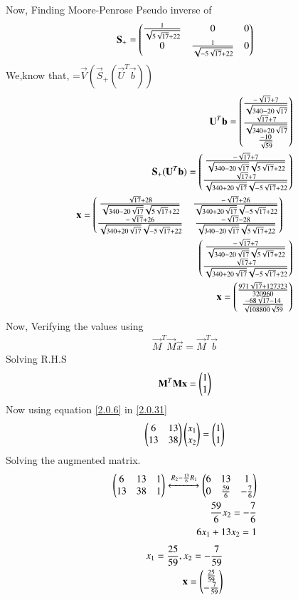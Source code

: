 \documentclass[journal,12pt,twocolumn]{IEEEtran}
\begin{document}
Now, Finding Moore-Penrose Pseudo inverse of 
\begin{align}
\mathbf{S}_+=\begin{pmatrix}\frac{1}{\sqrt{5\sqrt{17}+22}}&0&0\\0&\frac{1}{\sqrt{-5\sqrt{17}+22}}&0\end{pmatrix}
\end{align}
We,know that,
=$\vec{V}(\vec{S}_+(\vec{U}^T\vec{b}))$
\begin{align}
\vec{U}^T\vec{b}=\myvec{\frac{-\sqrt{17}+7}{\sqrt{340-20\sqrt{17}}}\\\frac{\sqrt{17}+7}{\sqrt{340+20\sqrt{17}}}\\\frac{-10}{\sqrt{59}}}\\
\vec{S}_+(\vec{U}^T\vec{b})=\myvec{\frac{-\sqrt{17}+7}{\sqrt{340-20\sqrt{17}}\sqrt{5\sqrt{17}+22}}\\\frac{\sqrt{17}+7}{\sqrt{340+20\sqrt{17}}\sqrt{-5\sqrt{17}+22}}}\\
\begin{multlined}
\vec{x}=\myvec{\frac{\sqrt{17}+28}{\sqrt{340-20\sqrt{17}}\sqrt{5\sqrt{17}+22}}&\frac{-\sqrt{17}+26}{\sqrt{340+20\sqrt{17}}\sqrt{-5\sqrt{17}+22}}\\\frac{-\sqrt{17}+26}{\sqrt{340+20\sqrt{17}}\sqrt{-5\sqrt{17}+22}}&\frac{-\sqrt{17}-28}{\sqrt{340-20\sqrt{17}}\sqrt{5\sqrt{17}+22}}}\\
\myvec{\frac{-\sqrt{17}+7}{\sqrt{340-20\sqrt{17}}\sqrt{5\sqrt{17}+22}}\\\frac{\sqrt{17}+7}{\sqrt{340+20\sqrt{17}}\sqrt{-5\sqrt{17}+22}}}
\end{multlined}\\
\vec{x}=\myvec{\frac{971\sqrt{17}+127323}{320960}\\\frac{-68\sqrt{17}-14}{\sqrt{108800}\sqrt{59}}}
\end{align}
Now, Verifying the values using
\begin{align}
\vec{M}^T\vec{M}\vec{x} = \vec{M}^T\vec{b}
\end{align}
Solving R.H.S
\begin{align}
\mathbf{M}^T\mathbf{M}\mathbf{x} =\begin{pmatrix}1\\1\end{pmatrix}\label{2.0.31}
\end{align}
Now using equation \eqref{2.0.6} in \eqref{2.0.31}
\begin{align}
\begin{pmatrix}6&13\\13&38\end{pmatrix}\begin{pmatrix}x_1\\x_2\end{pmatrix}=\begin{pmatrix}1\\1\end{pmatrix}
\end{align}
Solving the augmented matrix.
\begin{align}
\begin{pmatrix}6&13&1\\13&38&1\end{pmatrix} \xleftrightarrow{R_2-{\frac{13}{6}}R_1}\begin{pmatrix}6&13&1\\0&\frac{59}{6}&-\frac{7}{6}\end{pmatrix}\\
\frac{59}{6}x_2=-\frac{7}{6}\\
6x_1+13x_2=1
\end{align}
\begin{align}
x_1= \frac{25}{59},
x_2=-\frac{7}{59}\\
\mathbf{x}=\begin{pmatrix}\frac{25}{59}\\-\frac{7}{59}\end{pmatrix}
\end{align}

 
\end{document}

